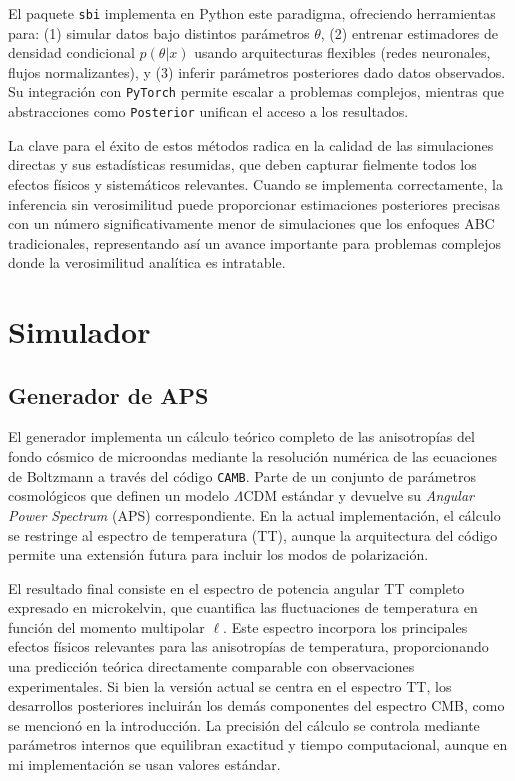 \documentclass[11pt]{article}
\begin{document}
El paquete \texttt{sbi} implementa en Python este paradigma, ofreciendo herramientas para: (1) simular datos bajo distintos parámetros $\theta$, (2) entrenar estimadores de densidad condicional $p(\theta|x)$ usando arquitecturas flexibles (redes neuronales, flujos normalizantes), y (3) inferir parámetros posteriores dado datos observados. Su integración con \texttt{PyTorch} permite escalar a problemas complejos, mientras que abstracciones como \texttt{Posterior} unifican el acceso a los resultados.

La clave para el éxito de estos métodos radica en la calidad de las simulaciones directas y sus estadísticas resumidas, que deben capturar fielmente todos los efectos físicos y sistemáticos relevantes. Cuando se implementa correctamente, la inferencia sin verosimilitud puede proporcionar estimaciones posteriores precisas con un número significativamente menor de simulaciones que los enfoques ABC tradicionales, representando así un avance importante para problemas complejos donde la verosimilitud analítica es intratable.

\section{Simulador}
\subsection{Generador de APS}
El generador implementa un cálculo teórico completo de las anisotropías del fondo cósmico de microondas mediante la resolución numérica de las ecuaciones de Boltzmann a través del código \texttt{CAMB}. Parte de un conjunto de parámetros cosmológicos que definen un modelo $\Lambda$CDM estándar y devuelve su \textit{Angular Power Spectrum} (APS) correspondiente. En la actual implementación, el cálculo se restringe al espectro de temperatura (TT), aunque la arquitectura del código permite una extensión futura para incluir los modos de polarización.

El resultado final consiste en el espectro de potencia angular TT completo expresado en microkelvin, que cuantifica las fluctuaciones de temperatura en función del momento multipolar $\ell$. Este espectro incorpora los principales efectos físicos relevantes para las anisotropías de temperatura, proporcionando una predicción teórica directamente comparable con observaciones experimentales. Si bien la versión actual se centra en el espectro TT, los desarrollos posteriores incluirán los demás componentes del espectro CMB, como se mencionó en la introducción. La precisión del cálculo se controla mediante parámetros internos que equilibran exactitud y tiempo computacional, aunque en mi implementación se usan valores estándar.
\end{document}
